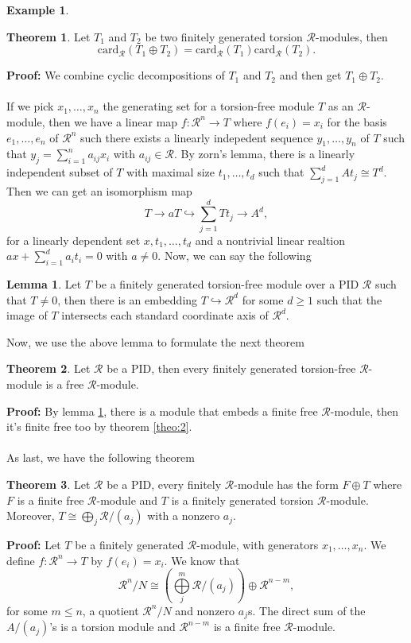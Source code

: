 \documentclass[11pt]{amsbook}%
\theoremstyle{plain}
\theoremstyle{definition}
\newtheorem*{example*}{Example}
\newtheorem{lemma}{Lemma}
\newtheorem{theorem}{Theorem}
\numberwithin{equation}{section}
\newcommand{\CR}{\mathcal R}
\newcommand{\card}{\text{card}}
\renewcommand{\proof}{ \textbf{Proof: }}
\begin{document}
\begin{example*}
\begin{theorem}
  \label{theo:3}
  Let $T_{1}$ and $T_{2}$ be two finitely generated torsion $\CR$-modules, then
  $$
  \card_{\CR}(T_{1} \oplus T_{2}) = \card_{\CR}(T_{1}) \card_{\CR}(T_{2}).
  $$
\end{theorem} \vspace{1.8em}
\proof We combine cyclic decompositions of $T_{1}$ and $T_{2}$
and then get $T_{1} \oplus T_{2}$. \qedsymbol \\ \\
If we pick $x_{1}, \dots, x_{n}$ the generating set for a torsion-free module $T$ as an $\CR$-module,
then we have a linear map $f: \CR^{n} \longrightarrow T$ where $f(e_{i}) = x_{i}$
for the basis $e_{1}, \dots, e_{n}$ of $\CR^{n}$ such there exists a linearly
indepedent sequence $y_{1}, \dots, y_{n}$ of $T$ such that $y_{j} = \sum_{i=1}^{n} a_{ij}x_{i}$ with $a_{ij} \in \CR$. By zorn's lemma, there is a linearly
independent subset of $T$ with maximal size $t_{1}, \dots, t_{d}$ such that
$\sum_{j=1}^{d} At_{j} \cong T^{d}$. Then we can get an isomorphism map
$$
T \rightarrow aT \hookrightarrow \sum_{j=1}^{d} Tt_{j} \rightarrow A^{d},
$$
for a linearly dependent set $x, t_{1}, \dots, t_{d}$ and a nontrivial linear
realtion $ax + \sum_{i=1}^{d} a_{i}t_{i} = 0$ with $a \neq 0$. Now, we can
say the following
\begin{lemma}
  \label{lem:3}
  Let $T$ be a finitely generated torsion-free module over a PID $\CR $ such that
  $T \neq 0$, then there is an embedding $T \hookrightarrow \CR^{d}$ for some
  $d \geq 1$ such that the image of $T$ intersects each standard coordinate
  axis of $\CR^{d}$.
\end{lemma} \vspace{1.8em}
Now, we use the above lemma to formulate the next theorem
\begin{theorem}
  \label{theo:4}
  Let $\CR$ be a PID, then every finitely generated torsion-free $\CR$-module
  is a free $\CR$-module.
\end{theorem} \vspace{1.8em}
\proof By lemma \ref{lem:3}, there is a module that embeds a finite
free $\CR$-module, then it's finite free too by theorem \ref{theo:2}. \qedsymbol \\ \\
As last, we have the following theorem
\begin{theorem}
  \label{lem:5}
  Let $\CR$ be a PID, every finitely $\CR$-module has the form $F \oplus T$ where
  $F$ is a finite free $\CR$-module and $T$ is a finitely generated torsion
  $\CR$-module. Moreover, $T \cong \bigoplus\limits_{j} \CR/(a_{j})$ with a nonzero $a_{j}$.
\end{theorem} \vspace{1.8em}
\proof Let $T$ be a finitely generated $\CR$-module, with generators
$x_{1}, \dots, x_{n}$. We define $f:\CR^{n} \longrightarrow T$ by $f(e_{i}) = x_{i}$. We know that 
$$
\CR^{n}/N \cong \left(\bigoplus\limits_{j}^{m} \CR/(a_{j})\right) \oplus \CR^{n-m},
$$
for some $m \leq n$, a quotient $\CR^{n}/N$ and nonzero $a_{j}$s. The direct
sum of the $A/(a_{j})$'s is a torsion module and $\CR^{n-m}$ is a finite
free $\CR$-module. \qedsymbol


\end{example*}
\end{document}
